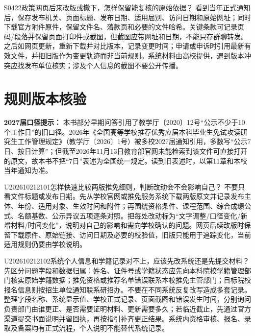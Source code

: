 
\begin{qa}{S0422}{政策网页后来改版或撤下，怎样保留能复核的原始依据？}
看到当年正式通知后，保存发布机关、页面标题、发布日期、适用届别、访问日期和原始网址；同时下载官方附件原件，保留文件名、落款页和必要的文件哈希。关键条款可记录页码/段落并保留页面打印件或截图，但截图应带网址和日期，不能只存群聊转发。之后如网页更新，重新下载并对比版本，记录变更时间；申请或申诉时引用最新有效文件，并把旧版作为变更轨迹而非当前规则。系统材料由高校提供，遇到版本冲突应找发布单位核实；涉及个人信息的截图不要公开传播。
\end{qa}

\section{规则版本核验}
\textbf{2027届口径提示：} 本书部分早期问答引用了教学厅〔2020〕12号“公示不少于10个工作日”的旧口径。2026年《全国高等学校推荐优秀应届本科毕业生免试攻读研究生工作管理规定》（教学厅〔2026〕1号）被多校2027届通知引用，多数写“公示7日、按日计算”；但截至2026年11月13日教育部官网未能检索到该文件可直接打开的原文，故本书不把“7日”表述为全国统一规定。读到旧表述时，以第11章和本校当年通知为准。
\begin{qa}{U202610212101}{怎样快速比较两版推免细则，判断改动会不会影响自己？}
不要只看文件标题或发布日期。先从学校官网或推免服务系统下载两版原文并记录发布主体、年份、适用对象、生效时间和附件；再围绕资格条件、课程范围、综合成绩公式、名额基数、公示异议五项逐条对照。把每处改动标为“文字调整/口径变化/新增材料/时间变化”，说明对自己的影响和需向学校确认的问题。网页后续改版时保留下载原件、原始链接、访问日期及必要的校验值，旧版只能用于追踪变化，当前适用规则仍要由学校说明。 
\end{qa}
\begin{qa}{U202610212102}{系统个人信息和学籍记录对不上，应该先改系统还是先提交材料？}
先区分问题字段和数据归属：姓名、证件号或学籍状态应先向本科院校学籍管理部门核实原始学籍数据；推免资格或推荐名单错误联系本校推免主管部门；目标院校报名信息则按招生单位通知联系研招办。不要在不同系统反复改写造成多套记录。整理字段名称、系统显示值、学校正式记录、页面截图和错误发生时间，分别询问负责部门由谁更正、是否需要证明材料、更新需要多久；若临近截止，先通过官方渠道提交书面说明并留回执，再按指引补齐更正结果。系统内资格审核、报名、录取及备案均有正式流程，个人说明不能替代系统记录。
\end{qa}

